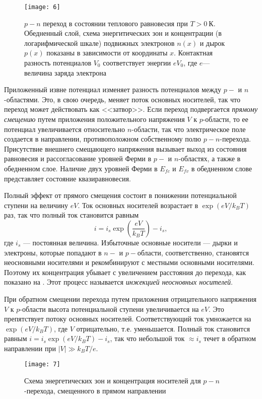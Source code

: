 \documentclass[a4paper, 12pt]{article}
\begin{document}
\begin{figure}[H]
    \texttt{[image: 6]} 
    \caption{$p-n$ переход в состоянии теплового равновесия при $T>0\:
    К$. Обедненный слой, схема энергитических зон и концентрации (в
логарифмической шкале) подвижных электронов $n(x)$ и дырок $p(x)$
показаны в зависимости от координаты $x$. Контактная разность
потенциалов $V_{0}$ соответствует энергии $eV_{0}$, где $e$---
величина заряда электрона}
\label{fig:6}
\end{figure}



Приложенный извне потенциал изменяет разность потенциалов между $p-$ и
$n$-областями. Это, в свою очередь, меняет поток основных носителей,
так что переход может действовать как <<затвор>>. Если переход
подвергается \emph{прямому смещению} путем приложения положительного
напряжения $V$ к $p$-области, то ее потенциал увеличивается
относительно $n$-области, так что электрическое поле создается в
направлении, противоположном собственному полю $p-n$-перехода.
Присутствие внешнего смещающего напряжения вызывает выход из состояния
равновесия и рассогласование уровней Ферми в $p-$ и $n$-областях, а
также в обедненном слое. Наличие двух уровней Ферми в $E_{fc}$ и
$E_{fv}$ в обедненном слове представляет состояние квазиравновесия.

Полный эффект от прямого смещения состоит в понижении потенциальной
ступени на величину $eV$. Ток основных носителей возрастает в
$\exp(eV/k_{B}T)$ раз, так что полный ток становится равным
\[
    i=i_{s}\exp \left( \frac{eV}{k_{B}T}\right)-i_{s},
\]
где $i_{s}$ --- постоянная величина. Избыточные основные носители ---
дырки и электроны, которые попадают в $n-$ и $p-$области,
соответственно, становятся неосновными носителями и рекомбинируют с
местными основными носителями. Поэтому их концентрация убывает с
увеличением расстояния до перехода, как показано на . Этот
процесс называется \emph{инжекцией неосновных носителей}.  

При обратном смещении перехода путем приложения отрицательного
напряжения $V$ к $p$-области высота потенциальной ступени
увеличивается на $eV$. Это препятствует потоку основных носителей.
Соответствующий ток умножается на $\exp (eV/k_{B}T)$, где $V$
отрицательно, т.е. уменьшается. Полный ток становится равным
$i=i_{s}\exp(eV/k_{B}T)-i_{s}$, так что небольшой ток $\approx i_{s}$
течет в обратном направлении при $|V|\gg k_{B}T/e$.


\begin{figure}[H]
    \texttt{[image: 7]} 
    \caption{Схема энергетических зон и концентрация носителей для
    $p-n$-перехода, смещенного в прямом направлении}
    \label{fig:7}
\end{figure}
\end{document}

